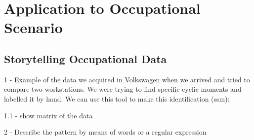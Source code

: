 




\section{Application to Occupational Scenario}
\label{cha:application_occ}

\subsection{Storytelling Occupational Data}
\label{subsec:storytel}

1 - Example of the data we acquired in Volkswagen when we arrived and tried to compare two workstations. We were trying to find specific cyclic moments and labelled it by hand. We can use this tool to make this identification (ssm):

1.1 - show matrix of the data

2 - Describe the pattern by means of words or a regular expression


